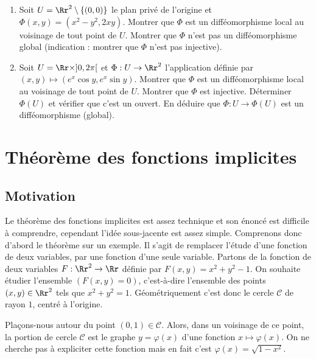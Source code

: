 \documentclass[11pt, class=report,crop=false]{standalone}
\begin{document}
\begin{miniexercices}
\sauteligne
\begin{enumerate}
  \item Soit $U = \Rr^2 \setminus \{ (0,0) \}$ le plan privé de l'origine et $\Phi(x,y)=(x^2-y^2,2xy)$.  
  Montrer que $\Phi$ est un difféomorphisme local au voisinage de
  tout point de $U$. Montrer que $\Phi$ n'est pas un difféomorphisme global (indication : montrer que $\Phi$ n'est pas injective).
  
  \item Soit $U = \Rr \times ]0,2\pi[$
  et $\Phi : U \to \Rr^2$ l'application définie
  par $(x,y) \mapsto (e^x\cos y,e^x\sin y)$.
  Montrer que $\Phi$ est un difféomorphisme local au voisinage de
  tout point de $U$.  Montrer que $\Phi$ est injective. Déterminer $\Phi(U)$ et vérifier que c'est un ouvert. En déduire que $\Phi : U \to \Phi(U)$ est un difféomorphisme (global).
\end{enumerate}
\end{miniexercices}




\section{Théorème des fonctions implicites}

\subsection{Motivation}

Le théorème des fonctions implicites est assez technique et son énoncé est difficile à comprendre, cependant l'idée  sous-jacente est assez simple.
Comprenons donc d'abord le théorème sur un exemple.
Il s'agit de remplacer l'étude d'une fonction de deux variables, par une fonction d'une seule variable.
Partons de la fonction de deux variables $F : \Rr^2 \to \Rr$ définie par $F(x,y) = x^2+y^2-1$.
On souhaite étudier l'ensemble $(F(x,y)=0)$, c'est-à-dire l'ensemble des points $(x,y) \in \Rr^2$ tels que $x^2+y^2=1$.
Géométriquement c'est donc le cercle $\mathcal{C}$ de rayon $1$, centré à l'origine.



\bigskip

Plaçons-nous autour du point $(0,1) \in \mathcal{C}$. Alors, dans un voisinage de ce point, la portion de cercle $\mathcal{C}$ est le graphe $y = \varphi(x)$ d'une fonction $x \mapsto \varphi(x)$. On ne cherche pas à expliciter cette fonction mais en fait c'est $\varphi(x) = \sqrt{1-x^2}$.
\end{document}
